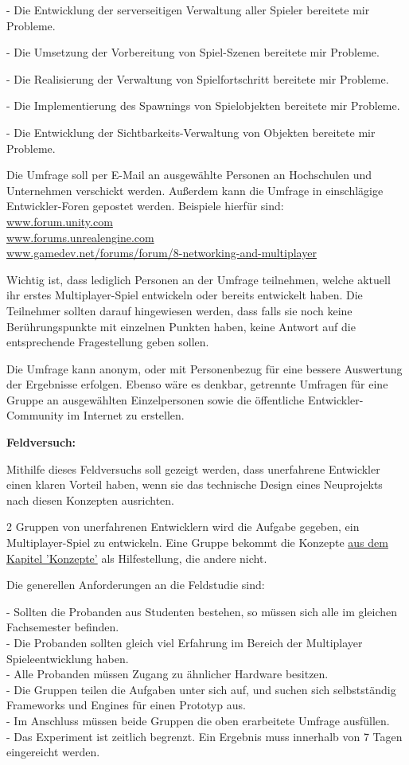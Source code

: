 - Die Entwicklung der serverseitigen Verwaltung aller Spieler bereitete mir Probleme.

- Die Umsetzung der Vorbereitung von Spiel-Szenen bereitete mir Probleme.

- Die Realisierung der Verwaltung von Spielfortschritt bereitete mir Probleme.

- Die Implementierung des Spawnings von Spielobjekten bereitete mir Probleme.

- Die Entwicklung der Sichtbarkeits-Verwaltung von Objekten bereitete mir Probleme.

Die Umfrage soll per E-Mail an ausgewählte Personen an Hochschulen und Unternehmen verschickt werden. Außerdem kann die Umfrage in einschlägige Entwickler-Foren gepostet werden. Beispiele hierfür sind: \\ \href{www.forum.unity.com}{www.forum.unity.com} \\
\href{www.forums.unrealengine.com}{www.forums.unrealengine.com} \\ \href{www.gamedev.net/forums/forum/8-networking-and-multiplayer}{www.gamedev.net/forums/forum/8-networking-and-multiplayer}

Wichtig ist, dass lediglich Personen an der Umfrage teilnehmen, welche aktuell ihr erstes Multiplayer-Spiel entwickeln oder bereits entwickelt haben. Die Teilnehmer sollten darauf hingewiesen werden, dass falls sie noch keine Berührungspunkte mit einzelnen Punkten haben, keine Antwort auf die entsprechende Fragestellung geben sollen.

Die Umfrage kann anonym, oder mit Personenbezug für eine bessere Auswertung der Ergebnisse erfolgen. Ebenso wäre es denkbar, getrennte Umfragen für eine Gruppe an ausgewählten Einzelpersonen sowie die öffentliche Entwickler-Community im Internet zu erstellen.

\textbf{Feldversuch:}

Mithilfe dieses Feldversuchs soll gezeigt werden, dass unerfahrene Entwickler einen klaren Vorteil haben, wenn sie das technische Design eines Neuprojekts nach diesen Konzepten ausrichten. 

2 Gruppen von unerfahrenen Entwicklern wird die Aufgabe gegeben, ein Multiplayer-Spiel zu entwickeln. Eine Gruppe bekommt die Konzepte \hyperref[sec:konzepte]{aus dem Kapitel 'Konzepte'} als Hilfestellung, die andere nicht.

Die generellen Anforderungen an die Feldstudie sind:

- Sollten die Probanden aus Studenten bestehen, so müssen sich alle im gleichen Fachsemester befinden. \\
- Die Probanden sollten gleich viel Erfahrung im Bereich der Multiplayer Spieleentwicklung haben. \\
- Alle Probanden müssen Zugang zu ähnlicher Hardware besitzen. \\
- Die Gruppen teilen die Aufgaben unter sich auf, und suchen sich selbstständig Frameworks und Engines für einen Prototyp aus. \\
- Im Anschluss müssen beide Gruppen die oben erarbeitete Umfrage ausfüllen. \\
- Das Experiment ist zeitlich begrenzt. Ein Ergebnis muss innerhalb von 7 Tagen eingereicht werden. 

